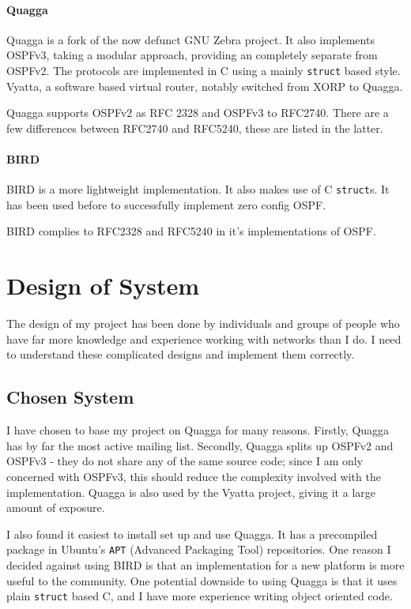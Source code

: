 \documentclass[12pt]{report}
\begin{document}
\subsubsection{Quagga}
Quagga is a fork of the now defunct GNU Zebra project. It also implements
OSPFv3, taking a modular approach, providing an completely separate from OSPFv2.
The protocols are implemented in C using a mainly \texttt{struct} based style.
Vyatta, a software based virtual router, notably switched from XORP to Quagga. 

Quagga supports OSPFv2 as RFC 2328 and OSPFv3 to RFC2740. There are a few
differences between RFC2740 and RFC5240, these are listed in the latter.

\subsubsection{BIRD}
BIRD is a more lightweight implementation. It also makes use of C
\texttt{struct}s. It has been used before to successfully implement zero config
OSPF. 

BIRD complies to RFC2328 and RFC5240 in it's implementations of OSPF. 

\chapter{Design of System}
The design of my project has been done by individuals and groups of
people who have far more knowledge and experience working with networks than I
do. I need to understand these complicated designs and implement them
correctly.

\section{Chosen System}
I have chosen to base my project on Quagga for many reasons. Firstly, Quagga has
by far the most active mailing list. Secondly, Quagga splits up OSPFv2 and
OSPFv3 - they do not share any of the same source code; since I am only
concerned with OSPFv3, this should reduce the complexity involved with the
implementation. Quagga is also used by the Vyatta project, giving it a large
amount of exposure. 

I also found it easiest to install set up and use Quagga. It has a precompiled
package in Ubuntu's \texttt{APT} (Advanced Packaging Tool)
 repositories. One reason I decided
against using BIRD is that an implementation for a new platform is more useful
to the community. One potential downside to using Quagga is that it uses plain
\texttt{struct} based C, and I have more experience writing object oriented
code. 
\end{document}
